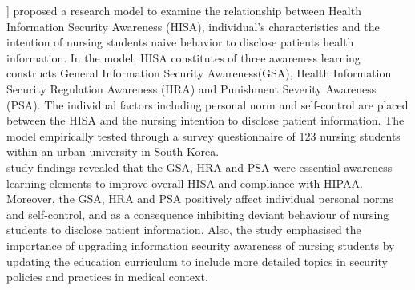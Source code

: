 \citet{Park2017} ] proposed a research model to examine the relationship between Health Information Security Awareness (HISA), individual’s characteristics and the intention of nursing students naive behavior to disclose patients health information. In the model, HISA constitutes of three awareness learning constructs General Information Security Awareness(GSA), Health Information Security Regulation Awareness (HRA) and Punishment Severity Awareness (PSA). The individual factors including personal norm and self-control are placed between the HISA and the nursing intention to disclose patient information. The model empirically tested through a survey questionnaire of 123 nursing students within an urban university in South Korea. \\
\citet{Park2017} study findings revealed that the GSA, HRA and PSA were essential awareness learning elements to improve overall HISA and compliance with HIPAA. Moreover, the GSA, HRA and PSA positively affect individual personal norms and self-control, and as a consequence inhibiting deviant behaviour of nursing students to disclose patient information. Also, the study emphasised the importance of upgrading information security awareness of nursing students by updating the education curriculum to include more detailed topics in security policies and practices in medical context.




